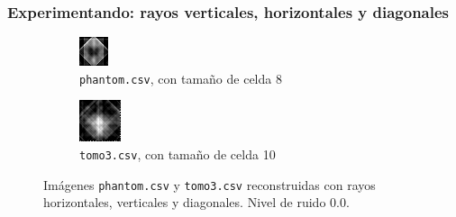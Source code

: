 \documentclass{beamer}
\begin{document}
\begin{frame}
\frametitle{Experimentando: rayos verticales, horizontales y diagonales}

\begin{figure}
\centering
\begin{subfigure}{0.5\textwidth}
  \centering
  \includegraphics[width=0.6\linewidth]{rayos/phantom-vhd}
  \caption{\texttt{phantom.csv}, con tamaño de celda 8}
\end{subfigure}%
\begin{subfigure}{0.5\textwidth}
  \centering
  \includegraphics[width=0.6\linewidth]{rayos/tomo3-vhd}
  \caption{\texttt{tomo3.csv}, con tamaño de celda 10}
\end{subfigure}
\caption{Imágenes \texttt{phantom.csv} y \texttt{tomo3.csv} reconstruidas con rayos horizontales, verticales y diagonales. Nivel de ruido 0.0.}
\label{fig:muestras_vhd}
\end{figure}

\end{frame}
\end{document}
